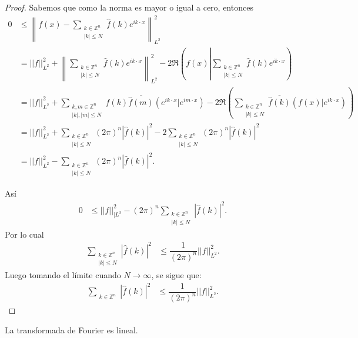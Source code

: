\documentclass[12pt]{article}
\newcommand\Z{\ensuremath{\mathbb{Z}}}
\begin{document}
\begin{proof}
Sabemos que como la norma es mayor o igual a cero, entonces
\begin{align*}
0 &\leq\left\|f(x)-\sum_{\substack{k\in \Z^{n}\\ |k|\leq N}}\widehat{f}(k)e^{ik\cdot x}\right\|^{2}_{L^2}\\
&= || f||_{L^2}^{2}+ \left\| \sum_{\substack{k\in \Z^{n}\\|k|\leq N}} \widehat{f}(k)e^{ik\cdot x}\right\|_{L^2}^{2}- 2 \Re\left(f(x)\left|\sum_{\substack{k \in \Z^{n}\\ |k|\leq N}} \widehat{f}(k) e^{ik\cdot x}\right.\right)\\
&= || f||_{L^2}^{2}+ \sum_{\substack{k,m\in \Z^{n}\\ |k|,|m|\leq N}} \widehat{f}(k)\overline{\widehat{f}(m)}(e^{ik\cdot x}|e^{im\cdot x})- 2 \Re\left(\sum_{\substack{k \in \Z^{n}\\ |k|\leq N}} \overline{\widehat{f}(k)} \left(f(x) |e^{ik\cdot x}\right)\right)\\
&= || f||_{L^2}^{2}+ \sum_{\substack{k\in \Z^{n}\\ |k|\leq N}} (2\pi)^{n}\left|\widehat{f}(k)\right|^{2}-2 \sum_{\substack{k\in \Z^{n}\\ |k|\leq N}}(2\pi)^n\left|\widehat{f}(k)\right|^{2}\\
&= || f||_{L^2}^{2}- \sum_{\substack{k\in \Z^{n}\\ |k|\leq N}}(2\pi)^n\left|\widehat{f}(k)\right|^{2}.
\end{align*}

Así\begin{align*}
0 &\leq|| f||_{[L^2}^{2}-(2\pi)^n \sum_{\substack{k\in \Z^{n}\\ |k|\leq N}}\left|\widehat{f}(k)\right|^{2}.
\end{align*}
Por lo cual 
\begin{align*}
\sum_{\substack{k\in \Z^{n}\\ |k|\leq N}}\left|\widehat{f}(k)\right|^{2} &\leq\dfrac{1}{(2\pi)^n}|| f||_{L^2}^{2}.
\end{align*}
Luego tomando el límite cuando $N\rightarrow \infty$, se sigue que:
\begin{align*}
\sum_{\substack{k\in \Z^{n}}}\left|\widehat{f}(k)\right|^{2} &\leq\dfrac{1}{(2\pi)^n}|| f||_{L^2}^{2}.
\end{align*}
\end{proof}

\begin{theorem}
La transformada de Fourier es lineal.
\end{theorem}
\end{document}
